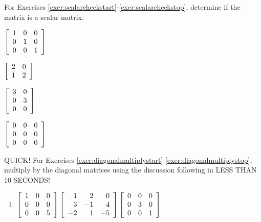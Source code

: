 \noindent For Exercises \ref{exer:scalarcheckstart}-\ref{exer:scalarcheckstop}, determine if the matrix is a scalar matrix.
\begin{enumerate}[!HW!, start=1]
\begin{multicols}{4}
\item\label{exer:scalarcheckstart} $\mtx{rrr}{1&0&0\\0&1&0\\0&0&1}$ %
\item $\mtx{rr}{2&0\\1&2}$ %
\item $\mtx{rr}{3&0\\0&3\\0&0}$ %
\item\label{exer:scalarcheckstop} $\mtx{rrr}{0&0&0\\0&0&0\\0&0&0}$ %
\end{multicols}
\end{enumerate}


\noindent QUICK! For Exercises \ref{exer:diagonalmultiplystart}-\ref{exer:diagonalmultiplystop}, multiply by the diagonal matrices using the discussion following  in LESS THAN 10 SECONDS! 
\begin{enumerate}[!HW!, label=$\spadesuit$ \arabic*., ref=\arabic*]
\item\label{exer:diagonalmultiplystop} $\mtx{rrr}{1&0&0\\0&0&0\\0&0&5}\mtx{rrr}{1&2&0\\3&-1&4\\-2&1&-5}\mtx{rrr}{0&0&0\\0&3&0\\0&0&1}$
\end{enumerate}

